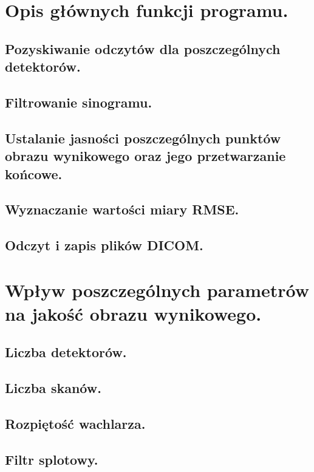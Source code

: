 \documentclass[paper=a4, fontsize=11pt]{scrartcl}
\begin{document}
	\section{Opis głównych funkcji programu.}
	\subsection{Pozyskiwanie odczytów dla poszczególnych detektorów.}
	\subsection{Filtrowanie sinogramu.}
	\subsection{Ustalanie jasności poszczególnych punktów obrazu wynikowego oraz jego przetwarzanie końcowe.}
	\subsection{Wyznaczanie wartości miary RMSE.}
	\subsection{Odczyt i zapis plików DICOM.}
	
	\section{Wpływ poszczególnych parametrów na jakość obrazu wynikowego.}
	\subsection{Liczba detektorów.}
	\subsection{Liczba skanów.}
	\subsection{Rozpiętość wachlarza.}
	\subsection{Filtr splotowy.}
\end{document}
